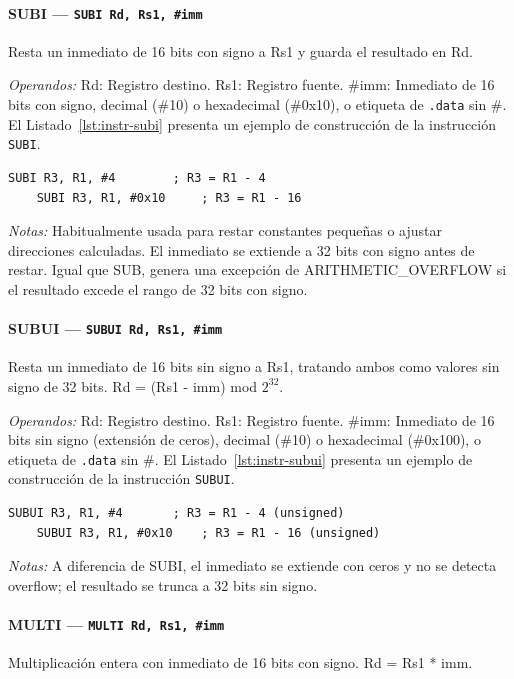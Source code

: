 \documentclass[../main.tex]{subfiles}
\begin{document}
\paragraph*{SUBI --- \texttt{SUBI Rd, Rs1, \#imm}}
Resta un inmediato de 16 bits con signo a Rs1 y guarda el resultado en Rd.

\textit{Operandos:} Rd: Registro destino. Rs1: Registro fuente. \#imm: Inmediato de 16 bits con signo, decimal (\#10) o hexadecimal (\#0x10), o etiqueta de \texttt{.data} sin \#.
El Listado~\ref{lst:instr-subi} presenta un ejemplo de construcción de la instrucción \texttt{SUBI}.

\begin{lstlisting}[caption={SUBI},label={lst:instr-subi}]
	SUBI R3, R1, #4        ; R3 = R1 - 4
	SUBI R3, R1, #0x10     ; R3 = R1 - 16
\end{lstlisting}
\textit{Notas:} Habitualmente usada para restar constantes pequeñas o ajustar direcciones calculadas. El inmediato se extiende a 32 bits con signo antes de restar. Igual que SUB, genera una excepción de ARITHMETIC\_OVERFLOW si el resultado excede el rango de 32 bits con signo.

\paragraph*{SUBUI --- \texttt{SUBUI Rd, Rs1, \#imm}}
Resta un inmediato de 16 bits sin signo a Rs1, tratando ambos como valores sin signo de 32 bits. Rd = (Rs1 - imm) mod $2^{32}$.

\textit{Operandos:} Rd: Registro destino. Rs1: Registro fuente. \#imm: Inmediato de 16 bits sin signo (extensión de ceros), decimal (\#10) o hexadecimal (\#0x100), o etiqueta de \texttt{.data} sin \#.
El Listado~\ref{lst:instr-subui} presenta un ejemplo de construcción de la instrucción \texttt{SUBUI}.

\begin{lstlisting}[caption={SUBUI},label={lst:instr-subui}]
	SUBUI R3, R1, #4       ; R3 = R1 - 4 (unsigned)
	SUBUI R3, R1, #0x10    ; R3 = R1 - 16 (unsigned)
\end{lstlisting}
\textit{Notas:} A diferencia de SUBI, el inmediato se extiende con ceros y no se detecta overflow; el resultado se trunca a 32 bits sin signo.

\paragraph*{MULTI --- \texttt{MULTI Rd, Rs1, \#imm}}
Multiplicación entera con inmediato de 16 bits con signo. Rd = Rs1 * imm.
\end{document}
